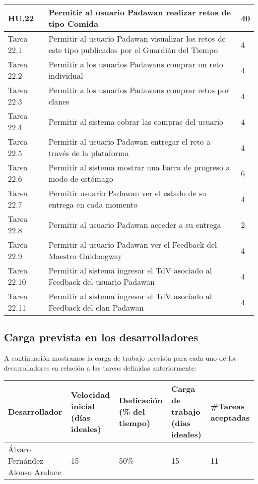 \begin{table}[h]
	\centering
	\begin{tabular}{| p{2.3cm} | p{6.7cm} | p{2cm} |}
		\rowcolor[HTML]{329A9D} 
		{\color[HTML]{FFFFFF} \textbf{HU.22}} & {\color[HTML]{FFFFFF} \textbf{Permitir al usuario Padawan realizar retos de tipo Comida}} & {\color[HTML]{FFFFFF} \textbf{40}}  \\ \hline
		Tarea 22.1 & Permitir al usuario Padawan visualizar los retos de este tipo publicados por el Guardián del Tiempo & 4 \\ \hline
		Tarea 22.2 & Permitir a los usuarios Padawans comprar un reto individual & 4 \\ \hline
		Tarea 22.3 & Permitir a los usuarios Padawans comprar retos por clanes & 4 \\ \hline
		Tarea 22.4 & Permitir al sistema cobrar las compras del usuario & 4 \\ \hline
		Tarea 22.5 & Permitir al usuario Padawan entregar el reto a través de la plataforma & 4 \\ \hline
		Tarea 22.6 & Permitir al sistema mostrar una barra de progreso a modo de estómago & 6 \\ \hline
		Tarea 22.7 & Permitir usuario Padawan ver el estado de su entrega en cada momento & 4 \\ \hline
		Tarea 22.8 & Permitir al usuario Padawan acceder a su entrega & 2 \\ \hline
		Tarea 22.9 & Permitir al usuario Padawan ver el Feedback del Maestro Guidoogway & 4 \\ \hline
		Tarea 22.10 & Permitir al sistema ingresar el TdV asociado al Feedback del usuario Padawan & 4 \\
		 \hline
		Tarea 22.11 & Permitir al sistema ingresar el TdV asociado al Feedback del clan Padawan & 4 \\ \hline
	\end{tabular}
\end{table}

\newpage

\subsection{Carga prevista en los desarrolladores}

A continuación mostramos la carga de trabajo prevista para cada uno de los desarrolladores en relación a las tareas definidas anteriormente:

\begin{table}[h]
	\centering
	\begin{tabular}{| p{3cm} | p{2cm} | p{2cm} | p{2cm} | p{2cm} |}
		\rowcolor[HTML]{329A9D} 
		{\color[HTML]{FFFFFF} \textbf{Desarrollador}} & {\color[HTML]{FFFFFF} \textbf{Velocidad inicial (días ideales)}} & {\color[HTML]{FFFFFF} \textbf{Dedicación (\% del tiempo)}} & {\color[HTML]{FFFFFF} \textbf{Carga de trabajo (días ideales)}} & {\color[HTML]{FFFFFF} \textbf{\#Tareas aceptadas}}  \\ \hline
		Álvaro Fernández-Alonso Araluce & 15 & 50\% & 15 & 11 \\ \hline
	\end{tabular}
\end{table}


